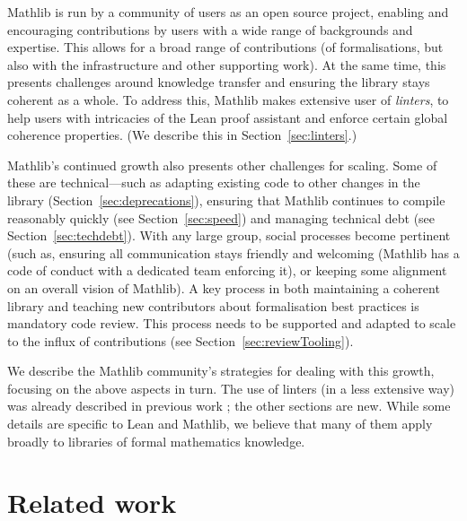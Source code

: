 \documentclass[runningheads]{llncs}
\def\Mathlib{Mathlib\xspace}
\def\mathlib{Mathlib\xspace}
\begin{document}
\Mathlib is run by a community of users as an open source project, enabling and encouraging contributions by users with a wide range of backgrounds and expertise. This allows for a broad range of contributions (of formalisations, but also with the infrastructure and other supporting work).
At the same time, this presents challenges around knowledge transfer and ensuring the library stays coherent as a whole.
To address this, \mathlib makes extensive user of \emph{linters}, to help users with intricacies of the Lean proof assistant and enforce certain global coherence properties. (We describe this in Section~\ref{sec:linters}.)

\Mathlib's continued growth also presents other challenges for scaling. Some of these are technical---such as adapting existing code to other changes in the library (Section~\ref{sec:deprecations}), ensuring that \mathlib continues to compile reasonably quickly (see Section~\ref{sec:speed}) and managing technical debt (see Section~\ref{sec:techdebt}).
With any large group, social processes become pertinent (such as, ensuring all communication stays friendly and welcoming (\mathlib has a code of conduct with a dedicated team enforcing it), or keeping some alignment on an overall vision of \mathlib).
A key process in both maintaining a coherent library and teaching new contributors about formalisation best practices is mandatory code review. This process needs to be supported and adapted to scale to the influx of contributions (see Section~\ref{sec:reviewTooling}).

We describe the \mathlib community's strategies for dealing with this growth, focusing on the above aspects in turn.
The use of linters (in a less extensive way) was already described in previous work \cite{VanDoornEbnerLewis20}; the other sections are new.
While some details are specific to Lean and \mathlib, we believe that many of them apply broadly to libraries of formal mathematics knowledge.

\section{Related work}
\end{document}
